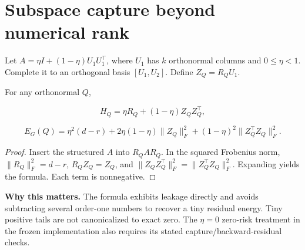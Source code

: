 \section{Subspace capture beyond numerical rank}\label{sec:capture}
\begin{lemma}\label{thm:T5}
Let $A=\eta I+(1-\eta)U_1U_1^\top$, where $U_1$ has $k$ orthonormal columns and $0\le\eta<1$. Complete it to an orthogonal basis $[U_1,U_2]$. Define $Z_Q=R_QU_1$.


For any orthonormal $Q$,


\begin{equation}
H_Q=\eta R_Q+(1-\eta)Z_QZ_Q^\top,
\end{equation}


\begin{equation}
\boxed{E_G(Q)=\eta^2(d-r)
+2\eta(1-\eta)\|Z_Q\|_F^2
+(1-\eta)^2\|Z_Q^\top Z_Q\|_F^2.}
\end{equation}


\end{lemma}
\begin{proof}
Insert the structured $A$ into $R_QAR_Q$. In the squared Frobenius norm, $\|R_Q\|_F^2=d-r$, $R_QZ_Q=Z_Q$, and $\|Z_QZ_Q^\top\|_F^2=\|Z_Q^\top Z_Q\|_F^2$. Expanding yields the formula. Each term is nonnegative.

\end{proof}


\textbf{Why this matters.} The formula exhibits leakage directly and avoids subtracting several order-one numbers to recover a tiny residual energy. Tiny positive tails are not canonicalized to exact zero. The $\eta=0$ zero-risk treatment in the frozen implementation also requires its stated capture/backward-residual checks.


